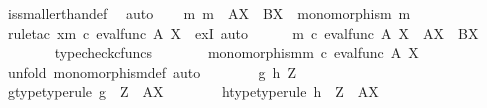 \begin{isabellebody}
\ is{\isacharunderscore}{\kern0pt}smaller{\isacharunderscore}{\kern0pt}than{\isacharunderscore}{\kern0pt}def\ \isamarkupfalse%
\ auto\isanewline
\ \ \isamarkupfalse%
\ {\isachardoublequoteopen}{\isasymexists}m{\isachardot}{\kern0pt}\ m\ {\isacharcolon}{\kern0pt}\ A\isactrlbsup X\isactrlesup \ {\isasymrightarrow}\ B\isactrlbsup X\isactrlesup \ {\isasymand}\ monomorphism\ m{\isachardoublequoteclose}\isanewline
\ \ \isamarkupfalse%
\ {\isacharparenleft}{\kern0pt}rule{\isacharunderscore}{\kern0pt}tac\ x{\isacharequal}{\kern0pt}{\isachardoublequoteopen}{\isacharparenleft}{\kern0pt}m\ {\isasymcirc}\isactrlsub c\ eval{\isacharunderscore}{\kern0pt}func\ A\ X{\isacharparenright}{\kern0pt}\isactrlsup {\isasymsharp}{\isachardoublequoteclose}\ \ exI{\isacharcomma}{\kern0pt}\ auto{\isacharparenright}{\kern0pt}\isanewline
\ \ \ \ \isamarkupfalse%
\ {\isachardoublequoteopen}{\isacharparenleft}{\kern0pt}m\ {\isasymcirc}\isactrlsub c\ eval{\isacharunderscore}{\kern0pt}func\ A\ X{\isacharparenright}{\kern0pt}\isactrlsup {\isasymsharp}\ {\isacharcolon}{\kern0pt}\ A\isactrlbsup X\isactrlesup \ {\isasymrightarrow}\ B\isactrlbsup X\isactrlesup {\isachardoublequoteclose}\isanewline
\ \ \ \ \ \ \isamarkupfalse%
\ typecheck{\isacharunderscore}{\kern0pt}cfuncs\isanewline
\ \ \ \ \isamarkupfalse%
\ \isamarkupfalse%
\ {\isachardoublequoteopen}monomorphism{\isacharparenleft}{\kern0pt}{\isacharparenleft}{\kern0pt}m\ {\isasymcirc}\isactrlsub c\ eval{\isacharunderscore}{\kern0pt}func\ A\ X{\isacharparenright}{\kern0pt}\isactrlsup {\isasymsharp}{\isacharparenright}{\kern0pt}{\isachardoublequoteclose}\isanewline
\ \ \ \ \isamarkupfalse%
\ {\isacharparenleft}{\kern0pt}unfold\ monomorphism{\isacharunderscore}{\kern0pt}def{}{\isacharcomma}{\kern0pt}\ auto{\isacharparenright}{\kern0pt}\isanewline
\ \ \ \ \ \ \isamarkupfalse%
\ g\ h\ Z\isanewline
\ \ \ \ \ \ \isamarkupfalse%
\ g{\isacharunderscore}{\kern0pt}type{\isacharbrackleft}{\kern0pt}type{\isacharunderscore}{\kern0pt}rule{\isacharbrackright}{\kern0pt}{\isacharcolon}{\kern0pt}\ {\isachardoublequoteopen}g\ {\isacharcolon}{\kern0pt}\ Z\ {\isasymrightarrow}\ A\isactrlbsup X\isactrlesup {\isachardoublequoteclose}\isanewline
\ \ \ \ \ \ \isamarkupfalse%
\ h{\isacharunderscore}{\kern0pt}type{\isacharbrackleft}{\kern0pt}type{\isacharunderscore}{\kern0pt}rule{\isacharbrackright}{\kern0pt}{\isacharcolon}{\kern0pt}\ {\isachardoublequoteopen}h\ {\isacharcolon}{\kern0pt}\ Z\ {\isasymrightarrow}\ A\isactrlbsup X\isactrlesup {\isachardoublequoteclose}\isanewline

\end{isabellebody}

